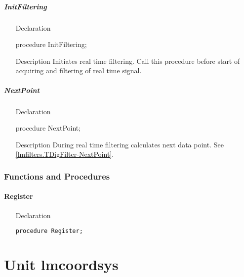 \documentclass[12pt,a4paper,oneside]{report}
\newcommand{\declarationitem}[1]{{\addfontfeatures{FakeSlant} #1}}
\newcommand{\descriptiontitle}[1]{{\addfontfeatures{FakeSlant}#1}}
\newcommand{\code}[1]{\texttt{#1}}
\begin{document}
\paragraph{InitFiltering}\hspace*{\fill}
\begin{itemize}
	\item[\declarationitem{Declaration}\hfill]
	\begin{flushleft}
	procedure InitFiltering;	
	\end{flushleft}
	\item[\descriptiontitle{Description}] Initiates real time filtering. Call this procedure before start of acquiring and filtering of real time signal.
\end{itemize}	
\paragraph{NextPoint}\hspace*{\fill}
\begin{itemize}
	\item[\declarationitem{Declaration}\hfill]
	\begin{flushleft}
		procedure NextPoint;
	\end{flushleft}
	\item[\descriptiontitle{Description}] During real time filtering calculates next data point. See \ref{lmfilters.TDigFilter-NextPoint}.
	
\end{itemize}	

\subsection{Functions and Procedures}
\subsubsection{Register}
\label{lmRecursFilters-Register}
\begin{itemize}\item[\declarationitem{Declaration}\hfill]
	\begin{flushleft}
		\code{procedure Register;}
	\end{flushleft}
\end{itemize}

\chapter{Unit lmcoordsys}
\label{lmcoordsys}
\end{document}
